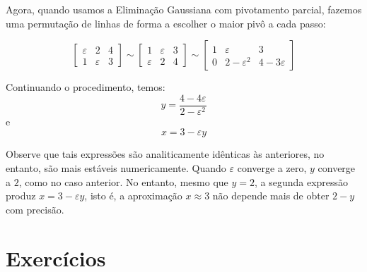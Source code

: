 \begin{ex}
Agora, quando usamos a Eliminação Gaussiana com pivotamento parcial, fazemos uma permutação de linhas de forma a escolher o maior pivô a cada passo:

$$\left[\begin{array}{cc|c}
\varepsilon & 2 & 4\\
1 & \varepsilon & 3
\end{array}
\right]\sim
\left[\begin{array}{cc|c}
1 & \varepsilon & 3\\
\varepsilon & 2 & 4
\end{array}
\right]\sim
\left[\begin{array}{cc|c}
1 & \varepsilon & 3\\
0 & 2-\varepsilon^2 & 4-3\varepsilon
\end{array}
\right]
$$

Continuando o procedimento, temos:
$$y=\frac{4-4\varepsilon}{2-\varepsilon^2}$$ e
$$x=3-\varepsilon y$$
\end{ex}

Observe que tais expressões são analiticamente idênticas às anteriores, no entanto, são mais estáveis numericamente. Quando $\varepsilon$ converge a zero, $y$ converge a $2$, como no caso anterior. No entanto, mesmo que $y=2$, a segunda expressão produz $x=3-\varepsilon y$, isto é, a aproximação $x\approx 3$ não depende mais de obter $2-y$ com precisão.

\section*{Exercícios}

